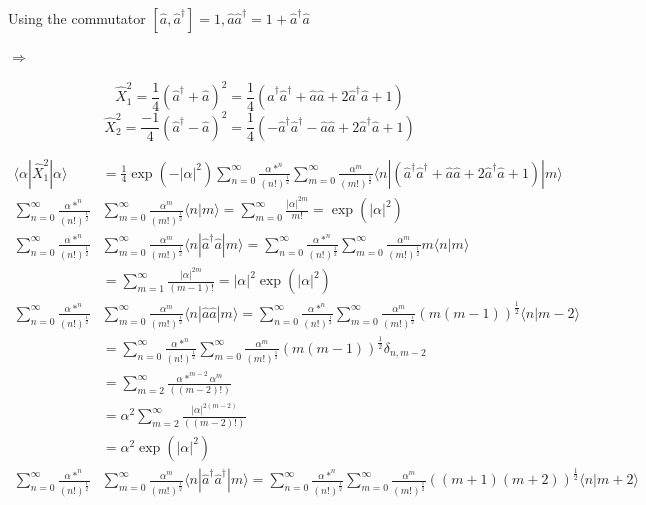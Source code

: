 \documentclass[a4paper,11pt]{article}
\begin{document}
Using the commutator \([\hat{a},\hat{a}^\dag] = 1, \hat{a}\hat{a}^\dag = 1+ \hat{a}^\dag\hat{a}\)

\(\Rightarrow\)

$$\hat{X}_1^2 = \frac{1}{4} (\hat{a}^\dag+\hat{a})^2 = \frac{1}{4} (\hat{a}^\dag\hat{a}^\dag+\hat{a}\hat{a}+2\hat{a}^\dag\hat{a}+1) $$
$$\hat{X}_2^2 = \frac{-1}{4} (\hat{a}^\dag-\hat{a})^2 = \frac{1}{4} (-\hat{a}^\dag\hat{a}^\dag-\hat{a}\hat{a}+2\hat{a}^\dag\hat{a}+1) $$


\begin{equation*}
\begin{split}
\langle\alpha|\hat{X}_1^2|\alpha\rangle & =\frac{1}{4} \exp\left(-|\alpha|^2\right) \sum_{n=0}^{\infty}\frac{\alpha*^n}{(n!)^\frac{1}{2}}  \sum_{m=0}^{\infty}\frac{\alpha^m}{(m!)^\frac{1}{2}}\langle n|(\hat{a}^\dag\hat{a}^\dag+\hat{a}\hat{a}+2\hat{a}^\dag\hat{a}+1) |m\rangle \\
\sum_{n=0}^{\infty}\frac{\alpha*^n}{(n!)^\frac{1}{2}}  & \sum_{m=0}^{\infty}\frac{\alpha^m}{(m!)^\frac{1}{2}}\langle n|m\rangle  = \sum_{m=0}^{\infty}\frac{|\alpha|^{2m}}{m!} = \exp\left(|\alpha|^2\right) \\
\sum_{n=0}^{\infty}\frac{\alpha*^n}{(n!)^\frac{1}{2}}  & \sum_{m=0}^{\infty}\frac{\alpha^m}{(m!)^\frac{1}{2}}\langle n|\hat{a}^\dag\hat{a}|m\rangle = \sum_{n=0}^{\infty}\frac{\alpha*^n}{(n!)^\frac{1}{2}}\sum_{m=0}^{\infty}\frac{\alpha^m}{(m!)^\frac{1}{2}}m\langle n|m\rangle \\
& = \sum_{m=1}^{\infty}\frac{|\alpha|^{2m}}{(m-1)!} = |\alpha|^2 \exp\left(|\alpha|^2\right)\\
\sum_{n=0}^{\infty}\frac{\alpha*^n}{(n!)^\frac{1}{2}}  & \sum_{m=0}^{\infty}\frac{\alpha^m}{(m!)^\frac{1}{2}}\langle n|\hat{a}\hat{a}|m\rangle = \sum_{n=0}^{\infty}\frac{\alpha*^n}{(n!)^\frac{1}{2}}   \sum_{m=0}^{\infty}\frac{\alpha^m}{(m!)^\frac{1}{2}}(m(m-1))^\frac{1}{2}\langle n|m-2\rangle \\
& = \sum_{n=0}^{\infty}\frac{\alpha*^n}{(n!)^\frac{1}{2}}  \sum_{m=0}^{\infty}\frac{\alpha^m}{(m!)^\frac{1}{2}}(m(m-1))^\frac{1}{2}\delta_{n, m-2} \\
& = \sum_{m=2}^{\infty}\frac{\alpha*^{m-2}\alpha^m}{((m-2)!)} \\
& = \alpha^2\sum_{m=2}^{\infty}\frac{|\alpha|^{2(m-2)}}{((m-2)!)} \\
& = \alpha^2 \exp\left(|\alpha|^2\right)\\
\sum_{n=0}^{\infty}\frac{\alpha*^n}{(n!)^\frac{1}{2}}  & \sum_{m=0}^{\infty}\frac{\alpha^m}{(m!)^\frac{1}{2}}\langle n|\hat{a}^\dag\hat{a}^\dag|m\rangle = \sum_{n=0}^{\infty}\frac{\alpha*^n}{(n!)^\frac{1}{2}}   \sum_{m=0}^{\infty}\frac{\alpha^m}{(m!)^\frac{1}{2}}((m+1)(m+2))^\frac{1}{2}\langle n|m+2\rangle \\

\end{split}
\end{equation*}
\end{document}
